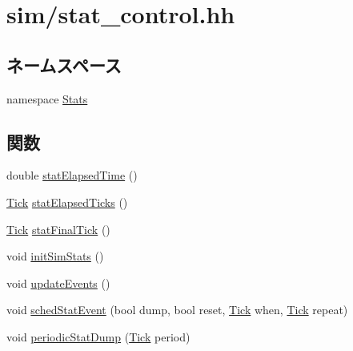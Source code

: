 \hypertarget{stat__control_8hh}{
\section{sim/stat\_\-control.hh}
\label{stat__control_8hh}
}
\subsection*{ネームスペース}
\begin{DoxyCompactItemize}
\item 
namespace \hyperlink{namespaceStats}{Stats}
\end{DoxyCompactItemize}
\subsection*{関数}
\begin{DoxyCompactItemize}
\item 
double \hyperlink{namespaceStats_a7c6e317fe9c5940f569f4cfcc2dfc4f0}{statElapsedTime} ()
\item 
\hyperlink{base_2types_8hh_a5c8ed81b7d238c9083e1037ba6d61643}{Tick} \hyperlink{namespaceStats_af28ec9ce3803a1b3c1bed5ff00dcfc3d}{statElapsedTicks} ()
\item 
\hyperlink{base_2types_8hh_a5c8ed81b7d238c9083e1037ba6d61643}{Tick} \hyperlink{namespaceStats_a6c4d8a90f360411dd56c18419fd717e2}{statFinalTick} ()
\item 
void \hyperlink{namespaceStats_a41c3cca28455a2222dde08e12245c9bc}{initSimStats} ()
\item 
void \hyperlink{namespaceStats_a1f815ddbb90ccb7fb9490080dcb6f3c5}{updateEvents} ()
\item 
void \hyperlink{namespaceStats_a56048d09cf003ffc313141376a84e7ad}{schedStatEvent} (bool dump, bool reset, \hyperlink{base_2types_8hh_a5c8ed81b7d238c9083e1037ba6d61643}{Tick} when, \hyperlink{base_2types_8hh_a5c8ed81b7d238c9083e1037ba6d61643}{Tick} repeat)
\item 
void \hyperlink{namespaceStats_a177a9c0907d7af207ceba422e0429cec}{periodicStatDump} (\hyperlink{base_2types_8hh_a5c8ed81b7d238c9083e1037ba6d61643}{Tick} period)
\end{DoxyCompactItemize}
